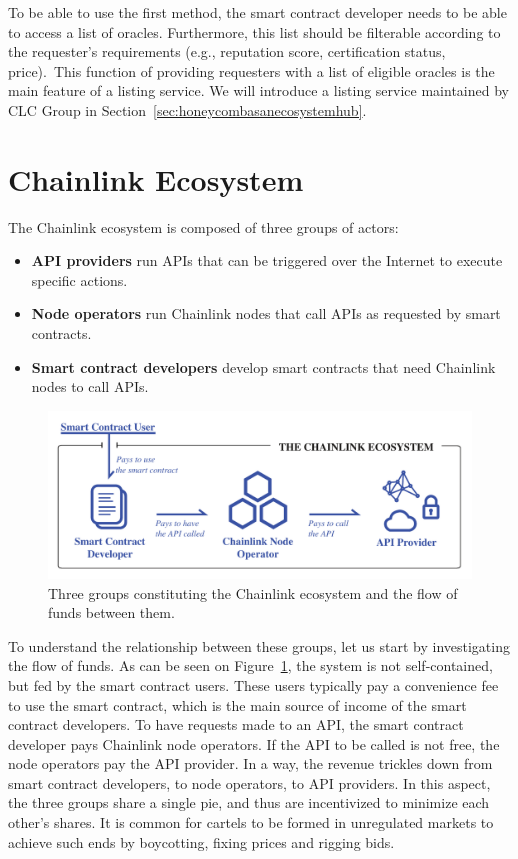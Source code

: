 \documentclass[12pt]{article}
\begin{document}
To be able to use the first method, the smart contract developer needs to be able to access a list of oracles.
Furthermore, this list should be filterable according to the requester’s requirements (e.g., reputation score, certification status, price).~This function of providing requesters with a list of eligible oracles is the main feature of a listing service.
We will introduce a listing service maintained by CLC Group in Section~\ref{sec:honeycombasanecosystemhub}.


\section{Chainlink Ecosystem}
\label{sec:chainlinkecosystem}

The Chainlink ecosystem is composed of three groups of actors:
\begin{itemize}
	\item \textbf{API providers} run APIs that can be triggered over the Internet to execute specific actions.
	\item \textbf{Node operators} run Chainlink nodes that call APIs as requested by smart contracts.
	\item \textbf{Smart contract developers} develop smart contracts that need Chainlink nodes to call APIs.
\end{itemize}

\begin{figure}
	\includegraphics[width=\textwidth]{Figures/cashflow}
	\caption{Three groups constituting the Chainlink ecosystem and the flow of funds between them.}
	\label{fig:cashflow}
\end{figure}

To understand the relationship between these groups, let us start by investigating the flow of funds.
As can be seen on Figure~\ref{fig:cashflow}, the system is not self-contained, but fed by the smart contract users.
These users typically pay a convenience fee to use the smart contract, which is the main source of income of the smart contract developers.
To have requests made to an API, the smart contract developer pays Chainlink node operators.
If the API to be called is not free, the node operators pay the API provider.
In a way, the revenue trickles down from smart contract developers, to node operators, to API providers.
In this aspect, the three groups share a single pie, and thus are incentivized to minimize each other’s shares.
It is common for cartels to be formed in unregulated markets to achieve such ends by boycotting, fixing prices and rigging bids.
\end{document}
